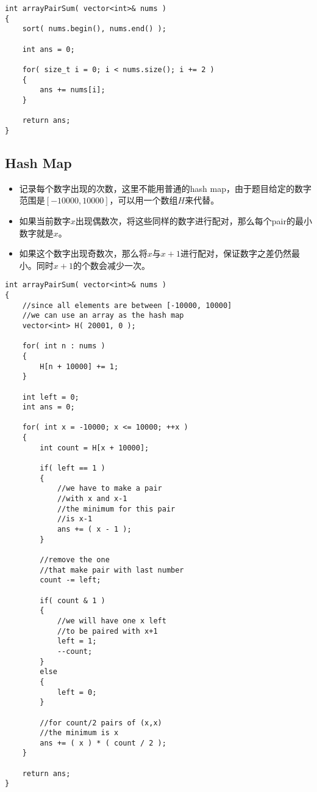 \setcounter{lstlisting}{0}
\begin{lstlisting}[style=customc, caption={Sorting}]
int arrayPairSum( vector<int>& nums )
{
    sort( nums.begin(), nums.end() );

    int ans = 0;

    for( size_t i = 0; i < nums.size(); i += 2 )
    {
        ans += nums[i];
    }

    return ans;
}
\end{lstlisting}

\subsection{Hash Map}
\begin{itemize}
\item 记录每个数字出现的次数，这里不能用普通的hash map，由于题目给定的数字范围是$ [-10000, 10000] $，可以用一个数组$H$来代替。
\item 如果当前数字$x$出现偶数次，将这些同样的数字进行配对，那么每个pair的最小数字就是$x$。
\item 如果这个数字出现奇数次，那么将$x$与$x+1$进行配对，保证数字之差仍然最小。同时$x+1$的个数会减少一次。
\end{itemize}

\begin{lstlisting}[style=customc, caption={Hash Map}]
int arrayPairSum( vector<int>& nums )
{
    //since all elements are between [-10000, 10000]
    //we can use an array as the hash map
    vector<int> H( 20001, 0 );

    for( int n : nums )
    {
        H[n + 10000] += 1;
    }

    int left = 0;
    int ans = 0;

    for( int x = -10000; x <= 10000; ++x )
    {
        int count = H[x + 10000];

        if( left == 1 )
        {
            //we have to make a pair
            //with x and x-1
            //the minimum for this pair
            //is x-1
            ans += ( x - 1 );
        }

        //remove the one
        //that make pair with last number
        count -= left;

        if( count & 1 )
        {
            //we will have one x left
            //to be paired with x+1
            left = 1;
            --count;
        }
        else
        {
            left = 0;
        }

        //for count/2 pairs of (x,x)
        //the minimum is x
        ans += ( x ) * ( count / 2 );
    }

    return ans;
}
\end{lstlisting}